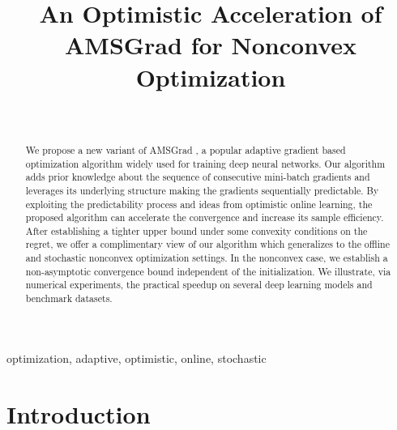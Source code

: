 \documentclass[wcp]{jmlr}
\title[OPT-AMS for Nonconvex Optimization]{An Optimistic Acceleration of AMSGrad for Nonconvex Optimization}
\author{\Name{Anonymous Authors} \Email{}\\
 }
\begin{document}
\maketitle

\begin{abstract}
We propose a new variant of AMSGrad \citep{RKK18}, a popular adaptive gradient based optimization algorithm widely used for training deep neural networks. 
Our algorithm adds prior knowledge about the sequence of consecutive mini-batch gradients and leverages its underlying structure making the gradients sequentially predictable. 
By exploiting the predictability process and ideas from optimistic online learning, the proposed algorithm can accelerate the convergence and increase its sample efficiency.
After establishing a tighter upper bound under some convexity conditions on the regret, we offer a complimentary view of our algorithm which generalizes to the offline and stochastic nonconvex optimization settings. 
In the nonconvex case, we establish a non-asymptotic convergence bound independent of the initialization.
We illustrate, via numerical experiments, the practical speedup on several deep learning models and benchmark datasets.

\end{abstract}
\begin{keywords}
optimization, adaptive, optimistic, online, stochastic
\end{keywords}

\section{Introduction}
\end{document}
